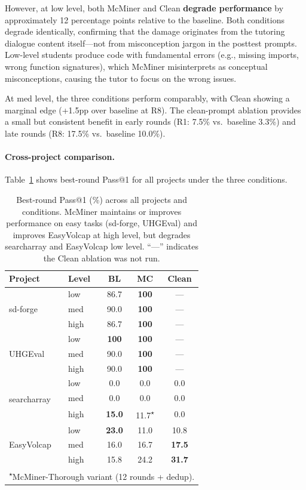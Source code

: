 \documentclass[11pt]{article}
\begin{document}
However, at low level, both McMiner and Clean \textbf{degrade performance} by approximately 12 percentage points relative to the baseline. Both conditions degrade identically, confirming that the damage originates from the tutoring dialogue content itself---not from misconception jargon in the posttest prompts. Low-level students produce code with fundamental errors (e.g., missing imports, wrong function signatures), which McMiner misinterprets as conceptual misconceptions, causing the tutor to focus on the wrong issues.

At med level, the three conditions perform comparably, with Clean showing a marginal edge (+1.5pp over baseline at R8). The clean-prompt ablation provides a small but consistent benefit in early rounds (R1: 7.5\% vs.\ baseline 3.3\%) and late rounds (R8: 17.5\% vs.\ baseline 10.0\%).

\paragraph{Cross-project comparison.} Table~\ref{tab:mcminer-all} shows best-round Pass@1 for all projects under the three conditions.

\begin{table}[t]
  \centering
  \small
  \begin{tabular}{llccc}
    \toprule
    \textbf{Project} & \textbf{Level} & \textbf{BL} & \textbf{MC} & \textbf{Clean} \\
    \midrule
    \multirow{3}{*}{sd-forge}
    & low  & 86.7 & \textbf{100}  & --- \\
    & med  & 90.0 & \textbf{100}  & --- \\
    & high & 86.7 & \textbf{100}  & --- \\
    \midrule
    \multirow{3}{*}{UHGEval}
    & low  & \textbf{100}  & \textbf{100}  & --- \\
    & med  & 90.0 & \textbf{100}  & --- \\
    & high & 90.0 & \textbf{100}  & --- \\
    \midrule
    \multirow{3}{*}{searcharray}
    & low  & 0.0 & 0.0 & 0.0 \\
    & med  & 0.0 & 0.0 & 0.0 \\
    & high & \textbf{15.0} & 11.7\textsuperscript{$\star$} & 0.0 \\
    \midrule
    \multirow{3}{*}{EasyVolcap}
    & low  & \textbf{23.0} & 11.0 & 10.8 \\
    & med  & 16.0 & 16.7 & \textbf{17.5} \\
    & high & 15.8 & 24.2 & \textbf{31.7} \\
    \bottomrule
    \multicolumn{5}{l}{\footnotesize \textsuperscript{$\star$}McMiner-Thorough variant (12 rounds + dedup).} \\
  \end{tabular}
  \caption{Best-round Pass@1 (\%) across all projects and conditions. McMiner maintains or improves performance on easy tasks (sd-forge, UHGEval) and improves EasyVolcap at high level, but degrades searcharray and EasyVolcap low level. ``---'' indicates the Clean ablation was not run.}
  \label{tab:mcminer-all}
\end{table}
\end{document}
